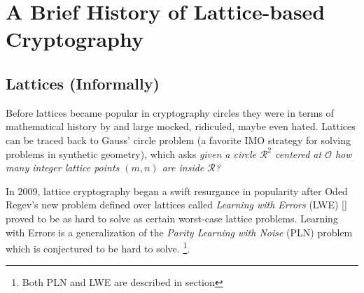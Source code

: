 \section{A Brief History of Lattice-based Cryptography}


\subsection*{Lattices (Informally)}

Before lattices became popular in cryptography circles they were in terms of mathematical history by and large mocked, ridiculed, maybe even hated. Lattices can be traced back to Gauss' circle problem (a favorite IMO strategy for solving problems in synthetic geometry), which asks \textit{given a circle $\mathcal{R}^{2}$ centered at $\mathcal{O}$ how many integer lattice points $(m,n)$ are inside $\mathcal{R}$?}


In 2009, lattice cryptography began a swift resurgance in popularity after Oded Regev's new problem defined over lattices called \emph{Learning with Errors} (LWE) [\cite{Reg2009}] proved to be as hard to solve as certain worst-case lattice problems. Learning with Errors is a generalization of the \emph{Parity Learning with Noise} (PLN) problem which is conjectured to be hard to solve. \footnote{Both PLN and LWE are described in section }.
 
 

